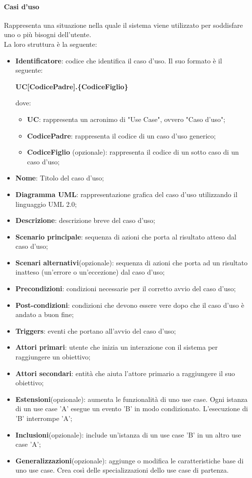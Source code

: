 \paragraph{Casi d'uso}
Rappresenta una situazione nella quale il sistema viene utilizzato per soddisfare uno o più bisogni dell'utente.\\
La loro struttura è la seguente:
\begin{itemize}
\item \textbf{Identificatore}: codice che identifica il caso d'uso. Il suo formato è il seguente:
\begin{center}
\textbf{UC[CodicePadre].\{CodiceFiglio\}}\\
\end{center}
dove:
\begin{itemize}
\item \textbf{UC}: rappresenta un acronimo di "Use Case", ovvero "Caso d'uso";
\item \textbf{CodicePadre}: rappresenta il codice di un caso d'uso generico;
\item \textbf{CodiceFiglio} (opzionale): rappresenta il codice di un sotto caso di un caso d'uso;
\end{itemize}
\item \textbf{Nome}: Titolo del caso d'uso;
\item \textbf{Diagramma UML}: rappresentazione grafica del caso d'uso utilizzando il linguaggio UML 2.0; 
\item \textbf{Descrizione}: descrizione breve del caso d'uso;
\item \textbf{Scenario principale}: sequenza di azioni che porta al risultato atteso dal caso d'uso;
\item \textbf{Scenari alternativi}(opzionale): sequenza di azioni che porta ad un risultato inatteso (un'errore o un'eccezione) dal caso d'uso;
\item \textbf{Precondizioni}: condizioni necessarie per il corretto avvio del caso d'uso;
\item \textbf{Post-condizioni}: condizioni che devono essere vere dopo che il caso d'uso è andato a buon fine;
\item \textbf{Triggers}: eventi che portano all'avvio del caso d'uso;
\item \textbf{Attori primari}: utente che inizia un interazione con il sistema per raggiungere un obiettivo;
\item \textbf{Attori secondari}: entità che aiuta l'attore primario a raggiungere il suo obiettivo;
\item \textbf{Estensioni}(opzionale): aumenta le funzionalità di uno use case. Ogni istanza di un use case 'A' esegue un evento 'B' in modo condizionato. L'esecuzione di 'B' interrompe 'A';
\item \textbf{Inclusioni}(opzionale): include un'istanza di un use case 'B' in un altro use case 'A';
\item \textbf{Generalizzazioni}(opzionale): aggiunge o modifica le caratteristiche base di uno use case. Crea così delle specializzazioni dello use case di partenza.
\end{itemize}